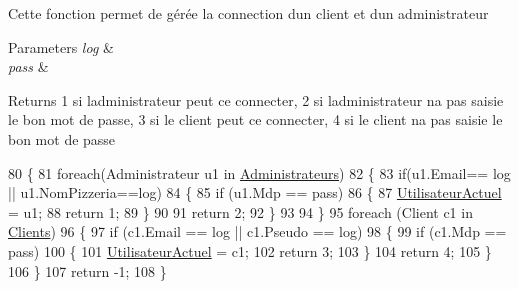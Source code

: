 Cette fonction permet de gérée la connection d\textquotesingle{}un client et d\textquotesingle{}un administrateur 


\begin{DoxyParams}{Parameters}
{\em log} & \\
\hline
{\em pass} & \\
\hline
\end{DoxyParams}
\begin{DoxyReturn}{Returns}
1 si l\textquotesingle{}administrateur peut ce connecter, 2 si l\textquotesingle{}administrateur n\textquotesingle{}a pas saisie le bon mot de passe, 3 si le client peut ce connecter, 4 si le client n\textquotesingle{}a pas saisie le bon mot de passe
\end{DoxyReturn}

\begin{DoxyCode}
80         \{
81             \textcolor{keywordflow}{foreach}(Administrateur u1 \textcolor{keywordflow}{in} \hyperlink{classModele_1_1Manager_ac8440a9781b104ad429965fcd460bf2f}{Administrateurs})
82             \{
83                 \textcolor{keywordflow}{if}(u1.Email== log || u1.NomPizzeria==log)
84                 \{
85                     \textcolor{keywordflow}{if} (u1.Mdp == pass)
86                     \{
87                         \hyperlink{classModele_1_1Manager_aa00c4632bd15b247d6b6793a6797dc82}{UtilisateurActuel} = u1;
88                         \textcolor{keywordflow}{return} 1;
89                     \}
90                         
91                     \textcolor{keywordflow}{return} 2;
92                 \}
93 
94             \}
95             \textcolor{keywordflow}{foreach} (Client c1 \textcolor{keywordflow}{in} \hyperlink{classModele_1_1Manager_aa91d850a379289e56012fc9b3912a7fe}{Clients})
96             \{
97                 \textcolor{keywordflow}{if} (c1.Email == log || c1.Pseudo == log)
98                 \{
99                     \textcolor{keywordflow}{if} (c1.Mdp == pass)
100                     \{
101                         \hyperlink{classModele_1_1Manager_aa00c4632bd15b247d6b6793a6797dc82}{UtilisateurActuel} = c1;
102                         \textcolor{keywordflow}{return} 3;
103                     \}
104                     \textcolor{keywordflow}{return} 4;
105                 \}
106             \}
107             \textcolor{keywordflow}{return} -1;
108         \}
\end{DoxyCode}
\mbox{\label{classModele_1_1Manager_ab8af03a34711cbfec2f0cf3a1ee8fbac}} 
